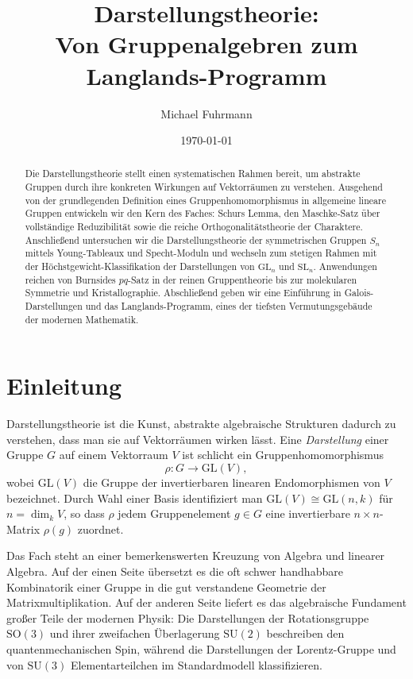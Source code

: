 \documentclass[12pt,a4paper]{amsart}
\title{Darstellungstheorie:\\
Von Gruppenalgebren zum Langlands-Programm}
\author{Michael Fuhrmann}
\date{\today}
\theoremstyle{definition}
\begin{document}
\begin{abstract}
Die Darstellungstheorie stellt einen systematischen Rahmen bereit, um abstrakte
Gruppen durch ihre konkreten Wirkungen auf Vektorräumen zu verstehen.  Ausgehend
von der grundlegenden Definition eines Gruppenhomomorphismus in allgemeine lineare
Gruppen entwickeln wir den Kern des Faches: Schurs Lemma, den Maschke-Satz über
vollständige Reduzibilität sowie die reiche Orthogonalitätstheorie der Charaktere.
Anschließend untersuchen wir die Darstellungstheorie der symmetrischen Gruppen
$S_n$ mittels Young-Tableaux und Specht-Moduln und wechseln zum stetigen Rahmen
mit der Höchstgewicht-Klassifikation der Darstellungen von $\mathrm{GL}_n$ und
$\mathrm{SL}_n$.  Anwendungen reichen von Burnsides $pq$-Satz in der reinen
Gruppentheorie bis zur molekularen Symmetrie und Kristallographie.  Abschließend
geben wir eine Einführung in Galois-Darstellungen und das Langlands-Programm,
eines der tiefsten Vermutungsgebäude der modernen Mathematik.
\end{abstract}

\maketitle

\tableofcontents

\section{Einleitung}

Darstellungstheorie ist die Kunst, abstrakte algebraische Strukturen dadurch zu
verstehen, dass man sie auf Vektorräumen wirken lässt.  Eine \emph{Darstellung}
einer Gruppe $G$ auf einem Vektorraum $V$ ist schlicht ein Gruppenhomomorphismus
\[
    \rho \colon G \longrightarrow \mathrm{GL}(V),
\]
wobei $\mathrm{GL}(V)$ die Gruppe der invertierbaren linearen Endomorphismen von
$V$ bezeichnet.  Durch Wahl einer Basis identifiziert man $\mathrm{GL}(V) \cong
\mathrm{GL}(n,k)$ für $n = \dim_k V$, so dass $\rho$ jedem Gruppenelement $g \in G$
eine invertierbare $n \times n$-Matrix $\rho(g)$ zuordnet.

Das Fach steht an einer bemerkenswerten Kreuzung von Algebra und linearer
Algebra.  Auf der einen Seite übersetzt es die oft schwer handhabbare Kombinatorik
einer Gruppe in die gut verstandene Geometrie der Matrixmultiplikation.  Auf der
anderen Seite liefert es das algebraische Fundament großer Teile der modernen
Physik: Die Darstellungen der Rotationsgruppe $\mathrm{SO}(3)$ und ihrer
zweifachen Überlagerung $\mathrm{SU}(2)$ beschreiben den quantenmechanischen
Spin, während die Darstellungen der Lorentz-Gruppe und von $\mathrm{SU}(3)$
Elementarteilchen im Standardmodell klassifizieren.
\end{document}
